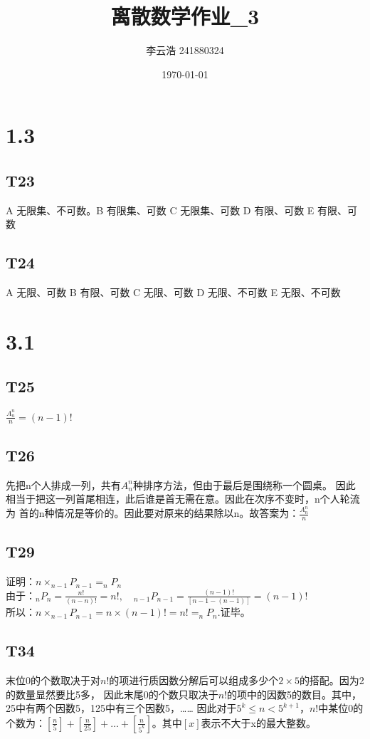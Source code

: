 \documentclass{article}
\title{离散数学作业\_3}
\author{李云浩 241880324}
\date{\today}
\begin{document}
\maketitle
\section{1.3}
\subsection{T23}
A 无限集、不可数。\quad B 有限集、可数 \quad C 无限集、可数 \quad 
D 有限、可数 \quad E 有限、可数
\subsection{T24}
A 无限、可数 \quad B 有限、可数 \quad C 无限、可数 \quad D 无限、不可数 \quad
E 无限、不可数
\section{3.1}
\subsection{T25}
$\frac{A_n^n}{n} = (n - 1)!$
\subsection{T26}
先把n个人排成一列，共有$A_n^n$种排序方法，但由于最后是围绕称一个圆桌。
因此相当于把这一列首尾相连，此后谁是首无需在意。因此在次序不变时，n个人轮流为
首的n种情况是等价的。因此要对原来的结果除以n。故答案为：$\frac{A_n^n}{n}$
\subsection{T29}
证明：$n \times _{n-1}P_{n-1} = _nP_n$\\
由于：$_nP_n = \frac{n!}{(n - n)!} = n!, \quad _{n-1}P_{n-1} = \frac{(n-1)!}{[n - 1 - (n - 1)]} = (n - 1)!$\\
所以：$n \times _{n-1}P_{n-1} = n \times (n - 1)! = n! = _nP_n$.证毕。

\subsection{T34}
末位0的个数取决于对$n!$的项进行质因数分解后可以组成多少个$2 \times 5$的搭配。因为2的数量显然要比5多，
因此末尾0的个数只取决于$n!$的项中的因数5的数目。其中，25中有两个因数5，125中有三个因数5，……
因此对于$5^k \leq n < 5^{k+1}$，$n!$中某位0的个数为：$\left[\frac{n}{5}\right] + \left[\frac{n}{25}\right]
+ \dots + \left[\frac{n}{5^k}\right]$。其中$\left[x\right]$表示不大于x的最大整数。
\end{document}
